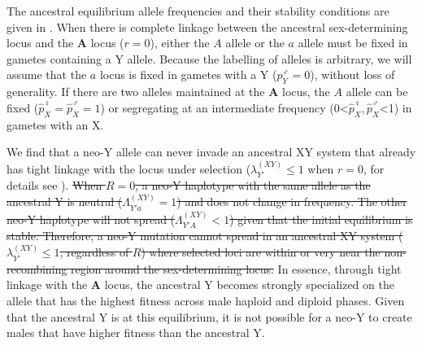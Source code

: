 \documentclass[10pt,letterpaper]{article}
\providecommand{\DIFdeltex}[1]{{\protect\color{red}\sout{#1}}}                      %
\providecommand{\DIFdelbegin}{} %
\providecommand{\DIFdelend}{} %
\providecommand{\DIFdel}[1]{\texorpdfstring{\DIFdeltex{#1}}{}} %
\begin{document}
The ancestral equilibrium allele frequencies and their stability conditions are given in . 
When there is complete linkage between the ancestral sex-determining locus and the $\mathbf{A}$ locus ($r=0$), either the $A$ allele or the $a$ allele must be fixed in gametes containing a Y allele. 
Because the labelling of alleles is arbitrary, we will assume that the $a$ locus is fixed in gametes with a Y ($p^\male_Y=0$), without loss of generality. 
If there are two alleles maintained at the $\mathbf{A}$ locus, the $A$ allele can be fixed ($\hat{p}^\female_X=\hat{p}^\male_X=1$) or segregating at an intermediate frequency (0<$\hat{p}^\female_X, \hat{p}^\male_X$<1) in gametes with an X. 

We find that a neo-Y allele can never invade an ancestral XY system that already has tight linkage with the locus under selection ($\lambda_{Y'}^{(XY)} \leq 1$ when $r=0$, for details see ). 
\DIFdelbegin \DIFdel{When $R=0$, a neo-Y haplotype with the same allele as the ancestral Y is neutral ($\Lambda_{Y'a}^{(XY)}=1$) and does not change in frequency.
The other neo-Y haplotype will not spread ($\Lambda_{Y'A}^{(XY)}<1$) given that the initial equilibrium is stable. 
Therefore, a neo-Y mutation cannot spread in an ancestral XY system ($\lambda_{Y'}^{(XY)} \leq 1$, regardless of $R$) where selected loci are within or very near the non-recombining region around the sex-determining locus.
}\DIFdelend %
In essence, through tight linkage with the $\mathbf{A}$ locus, the ancestral Y becomes strongly specialized on the allele that has the highest fitness across male haploid and diploid phases. 
Given that the ancestral Y is at this equilibrium, it is not possible for a neo-Y to create males that have higher fitness than the ancestral Y. 
\end{document}
